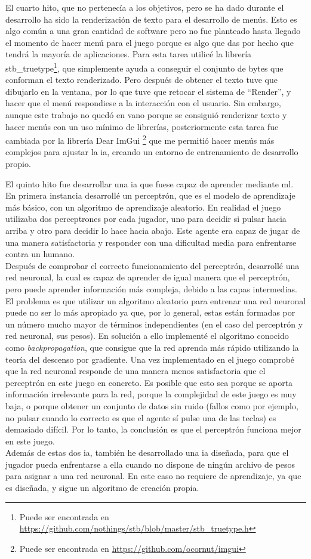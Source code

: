 El cuarto hito, que no pertenecía a los objetivos, pero se ha dado durante el desarrollo ha sido la renderización de texto para el desarrollo de menús. Esto es algo común a una gran cantidad de software pero no fue planteado hasta llegado el momento de hacer menú para el juego porque es algo que das por hecho que tendrá la mayoría de aplicaciones. Para esta tarea utilicé la librería stb\_truetype\footnote{Puede ser encontrada en \url{https://github.com/nothings/stb/blob/master/stb_truetype.h}}, que simplemente ayuda a conseguir el conjunto de bytes que conforman el texto renderizado. Pero después de obtener el texto tuve que dibujarlo en la ventana, por lo que tuve que retocar el sistema de ``Render'', y hacer que el menú respondiese a la interacción con el usuario. Sin embargo, aunque este trabajo no quedó en vano porque se consiguió renderizar texto y hacer menús con un uso mínimo de librerías, posteriormente esta tarea fue cambiada por la librería Dear ImGui \footnote{Puede ser encontrada en \url{https://github.com/ocornut/imgui}} que me permitió hacer menús más complejos para ajustar la \gls{ia}, creando un entorno de entrenamiento de desarrollo propio.

El quinto hito fue desarrollar una \gls{ia} que fuese capaz de aprender mediante \gls{ml}. En primera instancia desarrollé un perceptrón, que es el modelo de aprendizaje más básico, con un algoritmo de aprendizaje aleatorio. En realidad el juego utilizaba dos perceptrones por cada jugador, uno para decidir si pulsar hacia arriba y otro para decidir lo hace hacia abajo. Este agente era capaz de jugar de una manera satisfactoria y responder con una dificultad media para enfrentarse contra un humano. 
\\
Después de comprobar el correcto funcionamiento del perceptrón, desarrollé una red neuronal, la cual es capaz de aprender de igual manera que el perceptrón, pero puede aprender información más compleja, debido a las capas intermedias. El problema es que utilizar un algoritmo aleatorio para entrenar una red neuronal puede no ser lo más apropiado ya que, por lo general, estas están formadas por un número mucho mayor de términos independientes (en el caso del perceptrón y red neuronal, sus pesos). En solución a ello implementé el algoritmo conocido como \textit{backpropagation}, que consigue que la red aprenda más rápido utilizando la teoría del descenso por gradiente. Una vez implementado en el juego comprobé que la red neuronal responde de una manera menos satisfactoria que el perceptrón en este juego en concreto. Es posible que esto sea porque se aporta información irrelevante para la red, porque la complejidad de este juego es muy baja, o porque obtener un conjunto de datos sin ruido (fallos como por ejemplo, no pulsar cuando lo correcto es que el agente sí pulse una de las teclas) es demasiado difícil. Por lo tanto, la conclusión es que el perceptrón funciona mejor en este juego.
\\
Además de estas dos \gls{ia}, también he desarrollado una \gls{ia} diseñada, para que el jugador pueda enfrentarse a ella cuando no dispone de ningún archivo de pesos para asignar a una red neuronal. En este caso no requiere de aprendizaje, ya que es diseñada, y sigue un algoritmo de creación propia.

